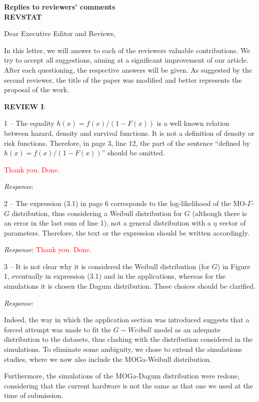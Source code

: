 \documentclass[version=last,12pt,{"maintainersDelight"}]{scrlttr2}
\begin{document}
\begin{letter}{\textbf{Replies to reviewers' comments}\\\textbf{REVSTAT}\\}
\opening{Dear Executive Editor and Reviews,}

In this letter, we will answer to each of the reviewers valuable
contributions. We try to accept all suggestions, aiming at a significant
improvement of our article. After each questioning, the respective
answers will be given. As suggested by the second reviewer, the title of
the paper was modified and better represents the proposal of the work.

\textbf{REVIEW I}:

1 -- The equality \(h(x)=f(x)/(1-F(x))\) is a well known relation
between hazard, density and survival functions. It is not a definition of density or risk functions. 
Therefore, in page 3, line 12, the part of the sentence ``defined by \(h(x)=f(x)/(1-F(x))\)'' should be 
omitted.

\textcolor{red}{Thank you. Done}. 

\emph{Response}:

2 -- The expression (3.1) in page 6 corresponds to the log-likelihood of the MO-\(\Gamma\)-\(G\) distribution, 
thus considering a Weibull distribution for \(G\) (although there is an error in the last sum 
of line 1), not a general distribution with a \(\eta\) 
vector of parameters. Therefore, the text or the expression 
should be written accordingly.

\emph{Response}: \textcolor{red}{Thank you. Done}. 

3 -- It is not clear why it is considered the Weibull distribution (for \(G\)) in Figure 1, eventually in expression (3.1) and in 
the applications, whereas for the simulations it is chosen the 
Dagum distribution. These choices should be clarified.

\emph{Response}:
{\color{red} Indeed, the way in which the application section was introduced suggests that a forced attempt was made to fit the $G\sim Weibull$ model as an adequate distribution to the datasets, thus clashing with the distribution considered in the simulations. To eliminate some ambiguity, we chose to extend the simulations studies, where we now also include the MOGa-Weibull distribution. 

Furthermore, the simulations of the MOGa-Dagum distribution were redone, considering that the current hardware is not 
the same as that one we used at the time of submission.

}
\end{letter}
\end{document}
